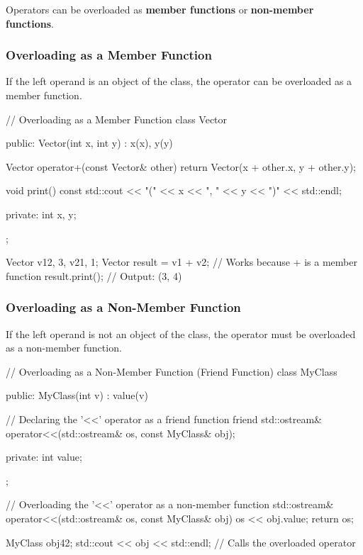 Operators can be overloaded as \textbf{member functions} or \textbf{non-member functions}.

\subsubsection{Overloading as a Member Function}

If the left operand is an object of the class, the operator can be overloaded as a member function.

\begin{codeblock}[language=C++, numbers=none]
// Overloading as a Member Function
class Vector {
public:
    Vector(int x, int y) : x(x), y(y) {}

    Vector operator+(const Vector& other) {
        return Vector(x + other.x, y + other.y);
    }

    void print() const {
        std::cout << "(" << x << ", " << y << ")" << std::endl;
    }

private:
    int x, y;
};

Vector v1{2, 3}, v2{1, 1};
Vector result = v1 + v2; // Works because + is a member function
result.print(); // Output: (3, 4)
\end{codeblock}

\subsubsection{Overloading as a Non-Member Function}

If the left operand is not an object of the class, the operator must be overloaded as a non-member function.

\begin{codeblock}[language=C++, numbers=none]
// Overloading as a Non-Member Function (Friend Function)
class MyClass {
public:
    MyClass(int v) : value(v) {}

    // Declaring the '<<' operator as a friend function
    friend std::ostream& operator<<(std::ostream& os, const MyClass& obj);

private:
    int value;
};

// Overloading the '<<' operator as a non-member function
std::ostream& operator<<(std::ostream& os, const MyClass& obj) {
    os << obj.value;
    return os;
}

MyClass obj{42};
std::cout << obj << std::endl; // Calls the overloaded operator
\end{codeblock}

